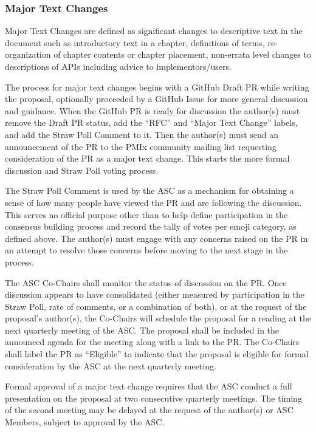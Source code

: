 \documentclass{article}
\begin{document}
\hypertarget{major-text-changes}{%
\subsubsection{Major Text Changes}%
\label{major-text-changes}}

Major Text Changes are defined as significant changes to descriptive text in
the document such as introductory text in a chapter, definitions of terms,
re-organization of chapter contents or chapter placement, non-errata level
changes to descriptions of APIs including advice to implementors/users.

The process for major text changes begins with a GitHub Draft PR while writing the proposal, optionally proceeded by a GitHub Issue for more general discussion and guidance.
When the GitHub PR is ready for discussion the author(s) must remove the Draft PR status, add the ``RFC'' and ``Major Text Change'' labels, and add the Straw Poll Comment to it.
Then the author(s) must send an announcement of the PR to the PMIx community mailing list requesting consideration of the PR as a major text change.
This starts the more formal discussion and Straw Poll voting process.

The Straw Poll Comment is used by the ASC as a mechanism for
obtaining a sense of how many people have viewed the PR and are
following the discussion. This serves no official purpose other than to
help define participation in the consensus building process and record
the tally of votes per emoji category, as defined above.
The author(s) must engage with any concerns raised on the PR in an attempt to
resolve those concerns before moving to the next stage in the process.

The ASC Co-Chairs shall monitor the status of discussion on the PR. Once
discussion appears to have consolidated (either measured by
participation in the Straw Poll, rate of comments, or a combination of
both), or at the request of the proposal's author(s), the Co-Chairs will
schedule the proposal for a reading at the next quarterly meeting of the
ASC. The proposal shall be included in the announced agenda for the
meeting along with a link to the PR.
The Co-Chairs shall label the PR as ``Eligible'' to indicate that the proposal is
eligible for formal consideration by the ASC at the next quarterly meeting.

Formal approval of a major text change requires that the ASC conduct a full
presentation on the proposal at two consecutive quarterly meetings. The
timing of the second meeting may be delayed at the request of the
author(s) or ASC Members, subject to approval by the ASC.
\end{document}
